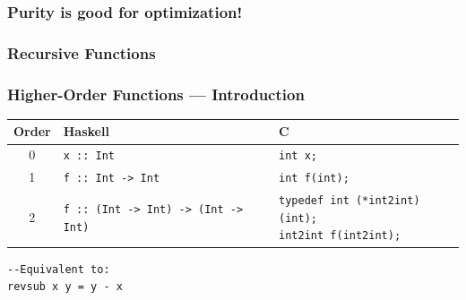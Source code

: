 \documentclass{beamer}
\begin{document}
\begin{frame}[fragile]
    \frametitle{Purity is good for optimization!}
    
    
\end{frame}


\begin{frame}
    \frametitle{Recursive Functions}
    

\end{frame}


\begin{frame}[fragile]
    \frametitle{Higher-Order Functions --- Introduction}

    \begin{small}
    \begin{tabularx}{\textwidth}{c l l}
        \toprule
        Order        & Haskell                  & C
        \\ \midrule

        0            & \texttt{x :: Int}        & \texttt{int x;}
        \\ \midrule

        1            & \texttt{f :: Int -> Int} & \texttt{int f(int);}
        \\ \midrule

        2            & \tiny{\texttt{f :: (Int -> Int) -> (Int -> Int)}} &
        \parbox{\textwidth}{%
            \tiny{\texttt{typedef int (*int2int)(int);}} \\
            \tiny{\texttt{int2int f(int2int);}}
        }
        \\ \bottomrule
    \end{tabularx}
    \end{small}

    \pause
    
    \begin{lstlisting}
--Equivalent to:
revsub x y = y - x
    \end{lstlisting}
\end{frame}
\end{document}
